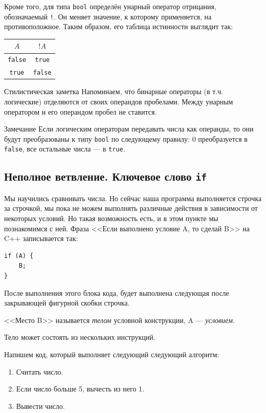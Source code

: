 \documentclass{article}
\newcommand{\tabularII}[1]{\begin{center}\begin{tabular}{|c|c|} #1 \end{tabular}\end{center}}
\newcommand{\style}[1]{
	\begin{sectionenv}[green!30!white]{Стилистическая заметка}
		#1
	\end{sectionenv}
}
\newcommand{\note}[1]{
	\begin{sectionenv}[yellow!30!white]{Замечание}
		#1
	\end{sectionenv}
}
\begin{document}
	Кроме того, для типа \texttt{bool} определён унарный оператор отрицания, обозначаемый \texttt{!}. Он меняет значение, к которому применяется, на противоположное. Таким образом, его таблица истинности выглядит так:
	
	\tabularII{
		\hline
		\textbf{$A$} & \textbf{$!A$}\\
		\hline
		\texttt{false} & \texttt{true}\\
		\hline
		\texttt{true} & \texttt{false}\\
		\hline
	}
	
	\style{Напоминаем, что бинарные операторы (в т.ч. логические) отделяются от своих операндов пробелами. Между унарным оператором и его операндом пробел не ставится.}
	
	\note{Если логическим операторам передавать числа как операнды, то они будут преобразованы к типу \texttt{bool} по следующему правилу: $0$ преобразуется в \texttt{false}, все остальные числа --- в \texttt{true}.}
	
	\subsection{Неполное ветвление. Ключевое слово \texttt{if}}
	
	Мы научились сравнивать числа. Но сейчас наша программа выполняется строчка за строчкой, мы пока не можем выполнять различные действия в зависимости от некоторых условий. Но такая возможность есть, и в этом пункте мы познакомимся с ней. Фраза <<Если выполнено условие A, то сделай B>> на C++ записывается так:
	
	\begin{lstlisting}
if (A) {
	B;
}
	\end{lstlisting}
	
	После выполнения этого блока кода, будет выполнена следующая после закрывающей фигурной скобки строчка.
	
	<<Место B>> называется \textit{телом} условной конструкции, A --- \textit{условием}.
	
	Тело может состоять из нескольких инструкций.
	
	Напишем код, который выполняет следующий следующий алгоритм:
	
	\begin{enumerate}
		\item{Считать число.}
		\item{Если число больше 5, вычесть из него 1.}
		\item{Вывести число.}
	\end{enumerate}
	
\end{document}
